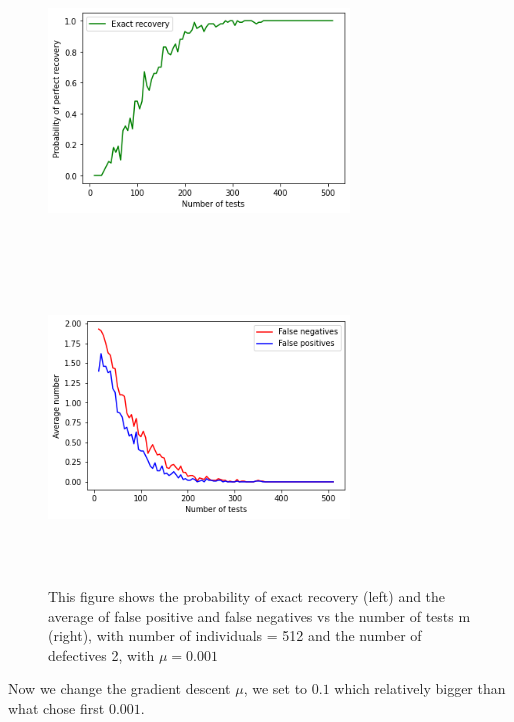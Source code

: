 \begin{figure}[H]
	\includegraphics[height=8cm, width=8cm]{images/512ex}
	\includegraphics[height=8cm, width=8cm]{images/512fal}
	\caption{This figure shows the probability of exact recovery (left) and  the average of false positive and false negatives vs the number of tests m (right), with number of individuals  = 512 and the number of defectives 2, with $ \mu = 0.001 $}
	\label{exat1}
\end{figure}

Now we change the gradient descent $ \mu $, we set to $ 0.1 $ which relatively bigger than what chose first $ 0.001 $.


